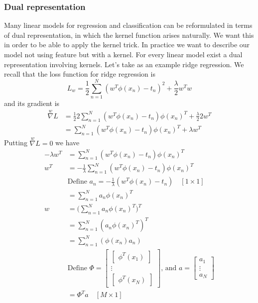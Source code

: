 \documentclass[main.tex]{subfiles}
\begin{document}
\subsubsection{Dual representation}
Many linear models for regression and classification can be reformulated in terms of dual representation, in which the kernel function arises naturally. We want this in order to be able to apply the kernel trick. In practice we want to describe our model not using feature but with a kernel. For every linear model exist a dual representation involving kernels. Let's take as an example ridge regression.
We recall that the loss function for ridge regression is
\begin{equation*}
    L_w = \frac{1}{2}\sum_{n=1}^N (w^T\phi(x_n) - t_n)^2 + \frac{\lambda}{2}w^T w
\end{equation*}
and its gradient is
\begin{align*}
    \overset{w}{\nabla}L &= \frac{1}{2} 2 \sum_{n=1}^N (w^T\phi(x_n) - t_n) \phi(x_n)^T + \frac{\lambda}{2}2 w^T \\
    &= \sum_{n=1}^N (w^T\phi(x_n) - t_n) \phi(x_n)^T + \lambda w^T
\end{align*}
Putting $\overset{w}{\nabla}L = 0$ we have
\begin{align*}
    -\lambda w^T &= \sum_{n=1}^N (w^T\phi(x_n) - t_n) \phi(x_n)^T \\
    w^T &= -\frac{1}{\lambda} \sum_{n=1}^N (w^T\phi(x_n) - t_n) \phi(x_n)^T \\
    & \text{Define } a_n = -\frac{1}{\lambda} (w^T\phi(x_n) - t_n) \quad [1 \times 1]\\
    &= \sum_{n=1}^N a_n \phi(x_n)^T \\
    w &= \bigg( \sum_{n=1}^N a_n \phi(x_n)^T \bigg)^T \\
    &= \sum_{n=1}^N (a_n \phi(x_n)^T)^T \\
    &= \sum_{n=1}^N (\phi(x_n) a_n) \\
    & \text{Define } \Phi = \begin{bmatrix}\begin{bmatrix}\phi^T(x_1)\end{bmatrix}\\ \vdots \\ \begin{bmatrix} \phi^T(x_N)\end{bmatrix}\end{bmatrix} \text{, and } a=\begin{bmatrix}a_1 \\ \vdots \\ a_N\end{bmatrix}\\
    &= \Phi^T a \quad [M \times 1]
\end{align*}
\end{document}
